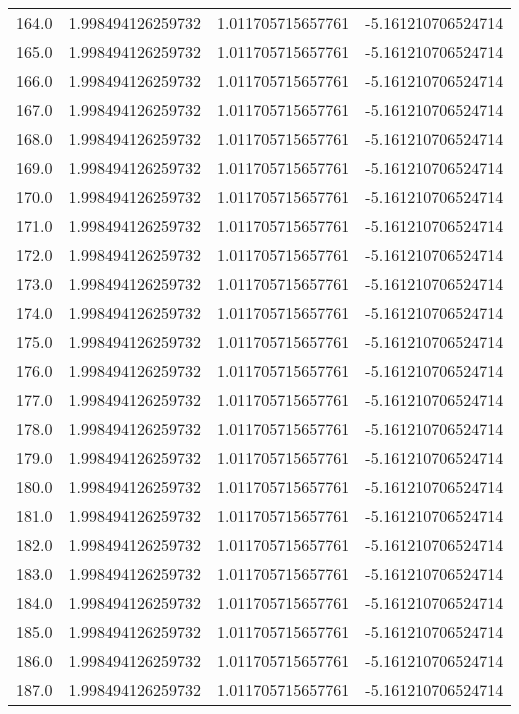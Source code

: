 \begin{longtable}{lrrr}
164.0 & 1.998494126259732 & 1.011705715657761 & -5.161210706524714 \\
165.0 & 1.998494126259732 & 1.011705715657761 & -5.161210706524714 \\
166.0 & 1.998494126259732 & 1.011705715657761 & -5.161210706524714 \\
167.0 & 1.998494126259732 & 1.011705715657761 & -5.161210706524714 \\
168.0 & 1.998494126259732 & 1.011705715657761 & -5.161210706524714 \\
169.0 & 1.998494126259732 & 1.011705715657761 & -5.161210706524714 \\
170.0 & 1.998494126259732 & 1.011705715657761 & -5.161210706524714 \\
171.0 & 1.998494126259732 & 1.011705715657761 & -5.161210706524714 \\
172.0 & 1.998494126259732 & 1.011705715657761 & -5.161210706524714 \\
173.0 & 1.998494126259732 & 1.011705715657761 & -5.161210706524714 \\
174.0 & 1.998494126259732 & 1.011705715657761 & -5.161210706524714 \\
175.0 & 1.998494126259732 & 1.011705715657761 & -5.161210706524714 \\
176.0 & 1.998494126259732 & 1.011705715657761 & -5.161210706524714 \\
177.0 & 1.998494126259732 & 1.011705715657761 & -5.161210706524714 \\
178.0 & 1.998494126259732 & 1.011705715657761 & -5.161210706524714 \\
179.0 & 1.998494126259732 & 1.011705715657761 & -5.161210706524714 \\
180.0 & 1.998494126259732 & 1.011705715657761 & -5.161210706524714 \\
181.0 & 1.998494126259732 & 1.011705715657761 & -5.161210706524714 \\
182.0 & 1.998494126259732 & 1.011705715657761 & -5.161210706524714 \\
183.0 & 1.998494126259732 & 1.011705715657761 & -5.161210706524714 \\
184.0 & 1.998494126259732 & 1.011705715657761 & -5.161210706524714 \\
185.0 & 1.998494126259732 & 1.011705715657761 & -5.161210706524714 \\
186.0 & 1.998494126259732 & 1.011705715657761 & -5.161210706524714 \\
187.0 & 1.998494126259732 & 1.011705715657761 & -5.161210706524714 \\

\end{longtable}
